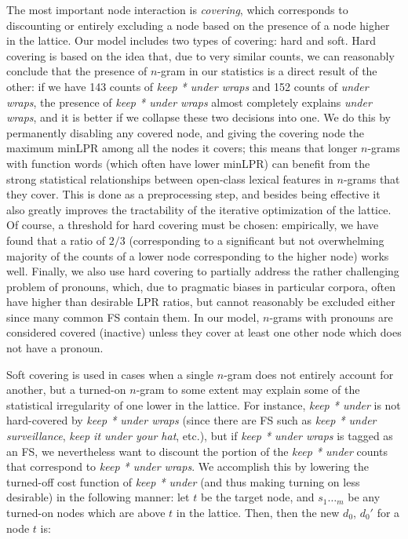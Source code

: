 \documentclass[11pt]{article}
\makeatletter
\def \etc {etc.\@ }
\makeatother
\begin{document}
The most important node interaction is \textit{covering}, which corresponds to discounting or entirely excluding a node based on the presence of a node higher in the lattice. Our model includes two types of covering: hard and soft. Hard covering is based on the idea that, due to very similar counts, we can reasonably conclude that the presence of $n$-gram in our statistics is a direct result of the other: if we have 143 counts of \emph{keep * under wraps} and 152 counts of \emph{under wraps}, the presence of \emph{keep * under wraps} almost completely explains \emph{under wraps}, and it is better if we collapse these two decisions into one. We do this by permanently disabling any covered node, and giving the covering node the maximum minLPR among all the nodes it covers; this means that longer $n$-grams with function words (which often have lower minLPR) can benefit from the strong statistical relationships between open-class lexical features in $n$-grams that they cover. This is done as a preprocessing step, and besides being effective it also greatly improves the tractability of the iterative optimization of the lattice. Of course, a threshold for hard covering must be chosen: empirically, we have found that a ratio of $2/3$ (corresponding to a significant but not overwhelming majority of the counts of a lower node corresponding to the higher node) works well. Finally, we also use hard covering to partially address the rather challenging problem of pronouns, which, due to pragmatic biases in particular corpora, often have higher than desirable LPR ratios, but cannot reasonably be excluded either since many common FS contain them. In our model, $n$-grams with pronouns are considered covered (inactive) unless they cover at least one other node which does not have a pronoun.

Soft covering is used in cases when a single $n$-gram does not entirely account for another, but a turned-on $n$-gram to some extent may explain some of the statistical irregularity of one lower in the lattice. For instance, \emph{keep * under} is not hard-covered by \emph{keep * under wraps} (since there are FS such as \emph{keep * under surveillance}, \emph{keep it under your hat}, \etc), but if \emph{keep * under wraps} is tagged as an FS, we nevertheless want to discount the portion of the \emph{keep * under} counts that correspond to \emph{keep * under wraps}. We accomplish this by lowering the turned-off cost function of \emph{keep * under} (and thus making turning on less desirable) in the following manner: let $t$ be the target node, and $s_1\ldots_m$ be any turned-on nodes which are above $t$ in the lattice. Then, then the new $d_0$, $d_0'$ for a node $t$ is:
\end{document}
